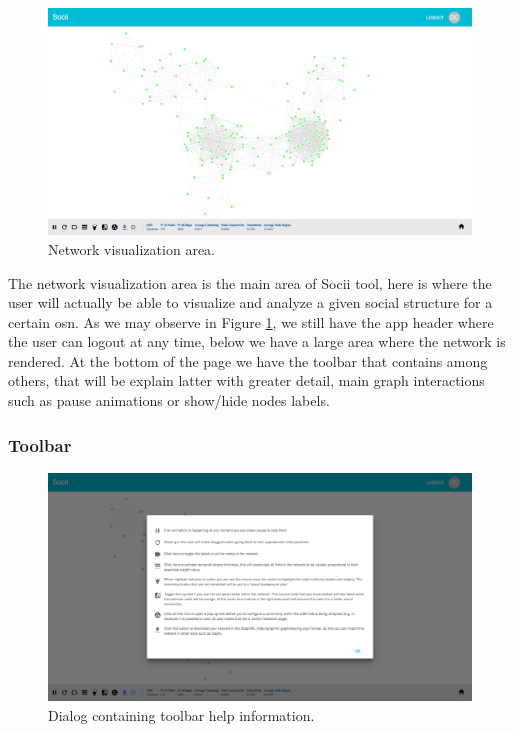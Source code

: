\begin{figure}[h!]
\begin{center}
  \hspace*{-0.8in}
  \includegraphics[width=1.2\textwidth]{img/socii/socii_3.png}
\end{center}
\caption{\label{img:socii_3} Network visualization area.}
\end{figure}

The network visualization area is the main area of Socii tool, here is where the user will actually be able to visualize and analyze a given social structure for a certain \gls{osn}. As we may observe in Figure \ref{img:socii_3}, we still have the app header where the user can logout at any time, below we have a large area where the network is rendered. At the bottom of the page we have the toolbar that contains among others, that will be explain latter with greater detail, main graph interactions such as pause animations or show/hide nodes labels.

\subsubsection{Toolbar}

\begin{figure}[h!]
\begin{center}
  \hspace*{-0.8in}
  \includegraphics[width=1.2\textwidth]{img/socii/socii_4.png}
\end{center}
\caption{\label{img:socii_4} Dialog containing toolbar help information.}
\end{figure}

